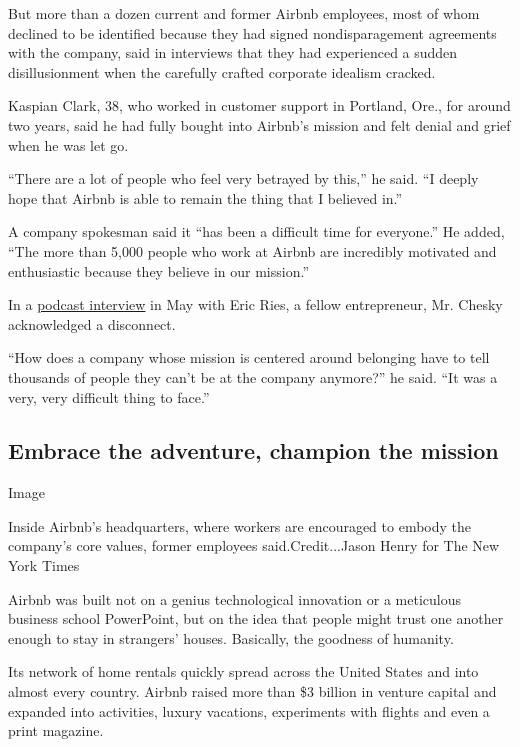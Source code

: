 But more than a dozen current and former Airbnb employees, most of whom
declined to be identified because they had signed nondisparagement
agreements with the company, said in interviews that they had
experienced a sudden disillusionment when the carefully crafted
corporate idealism cracked.

Kaspian Clark, 38, who worked in customer support in Portland, Ore., for
around two years, said he had fully bought into Airbnb's mission and
felt denial and grief when he was let go.

``There are a lot of people who feel very betrayed by this,'' he said.
``I deeply hope that Airbnb is able to remain the thing that I believed
in.''

A company spokesman said it ``has been a difficult time for everyone.''
He added, ``The more than 5,000 people who work at Airbnb are incredibly
motivated and enthusiastic because they believe in our mission.''

In a
\href{https://podcasts.apple.com/us/podcast/brian-chesky-part-one-the-heros-journey/id1505392824?i=1000475093717}{podcast
interview} in May with Eric Ries, a fellow entrepreneur, Mr. Chesky
acknowledged a disconnect.

``How does a company whose mission is centered around belonging have to
tell thousands of people they can't be at the company anymore?'' he
said. ``It was a very, very difficult thing to face.''

\hypertarget{embrace-the-adventure-champion-the-mission}{%
\subsection{Embrace the adventure, champion the
mission}\label{embrace-the-adventure-champion-the-mission}}

Image

Inside Airbnb's headquarters, where workers are encouraged to embody the
company's core values, former employees said.Credit...Jason Henry for
The New York Times

Airbnb was built not on a genius technological innovation or a
meticulous business school PowerPoint, but on the idea that people might
trust one another enough to stay in strangers' houses. Basically, the
goodness of humanity.

Its network of home rentals quickly spread across the United States and
into almost every country. Airbnb raised more than \$3 billion in
venture capital and expanded into activities, luxury vacations,
experiments with flights and even a print magazine.

